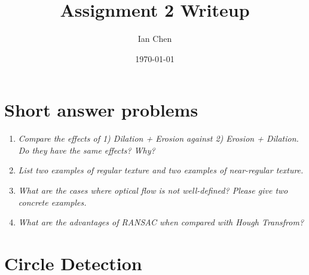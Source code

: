 \documentclass[11pt]{article}
\title{Assignment 2 Writeup}
\author{Ian Chen}
\date{\today}
\begin{document}
    \maketitle

    \section{Short answer problems}
    
    \begin{enumerate}
    \item \textit{Compare the effects of 1) Dilation + Erosion against 2) Erosion + Dilation. Do they have the same 
    effects? Why?}
    \text{}

    \item \textit{List two examples of regular texture and two examples of near-regular texture.}
    \text{}

    \item \textit{What are the cases where optical flow is not well-defined? Please give two concrete examples.}
    \text{}

    \item \textit{What are the advantages of RANSAC when compared with Hough Transfrom?}
    \text{}

    \end{enumerate}

    \section{Circle Detection}
\end{document}
